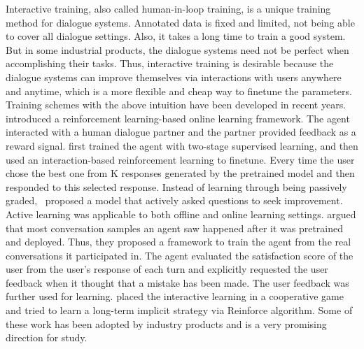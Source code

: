 \label{Interactive Training}
Interactive training, also called human-in-loop training, is a unique training method for dialogue systems. Annotated data is fixed and limited, not being able to cover all dialogue settings. Also, it takes a long time to train a good system. But in some industrial products, the dialogue systems need not be perfect when accomplishing their tasks. Thus, interactive training is desirable because the dialogue systems can improve themselves via interactions with users anywhere and anytime, which is a more flexible and cheap way to finetune the parameters. 
Training schemes with the above intuition have been developed in recent years.~ introduced a reinforcement learning-based online learning framework. The agent interacted with a human dialogue partner and the partner provided feedback as a reward signal.  first trained the agent with two-stage supervised learning, and then used an interaction-based reinforcement learning to finetune. Every time the user chose the best one from K responses generated by the pretrained model and then responded to this selected response. Instead of learning through being passively graded,~ proposed a model that actively asked questions to seek improvement. Active learning was applicable to both offline and online learning settings.  argued that most conversation samples an agent saw happened after it was pretrained and deployed. Thus, they proposed a framework to train the agent from the real conversations it participated in. The agent evaluated the satisfaction score of the user from the user's response of each turn and explicitly requested the user feedback when it thought that a mistake has been made. The user feedback was further used for learning.  placed the interactive learning in a cooperative game and tried to learn a long-term implicit strategy via Reinforce algorithm. Some of these work has been adopted by industry products and is a very promising direction for study.

